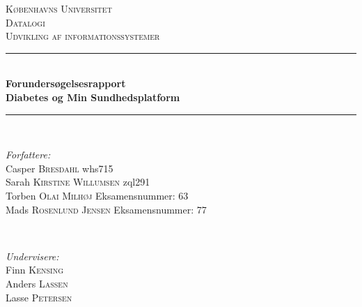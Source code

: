 \documentclass[12pt]{article}                                                        %
\begin{document}
	
	\begin{titlepage}
		
		\newcommand{\HRule}{\rule{\linewidth}{0.5mm}} %
		
		\center %
		
		
		\textsc{\Large Københavns Universitet}\\[1.5cm] %
		\textsc{\large Datalogi}\\[0.5cm] %
		\textsc{\normalsize Udvikling af informationssystemer}\\[0.5cm] %
		
		
		\HRule \\[0.4cm]
		{ \LARGE \bfseries Forundersøgelsesrapport\\Diabetes og Min Sundhedsplatform}\\[0.4cm] %
		\HRule \\[1.5cm]
		
		
		\begin{minipage}{0.4\textwidth}
			\begin{flushleft} \normalsize
				\emph{Forfattere:}\\ 
				Casper \textsc{Bresdahl} whs715\\
				Sarah \textsc{Kirstine Willumsen} zql291\\
				Torben \textsc{Olai Milhøj} Eksamensnummer: 63\\
				Mads \textsc{Rosenlund Jensen} Eksamensnummer: 77\\
			\end{flushleft}
		\end{minipage}
		~
		\begin{minipage}{0.4\textwidth}
			\begin{flushright} \normalsize
				\emph{Undervisere:} \\
				Finn \textsc{Kensing}\\ %
				Anders \textsc{Lassen}\\
				Lasse \textsc{Petersen}\\
				\hfill \\
			\end{flushright}
		\end{minipage}\\[2cm]
		

\end{titlepage}
\end{document}
